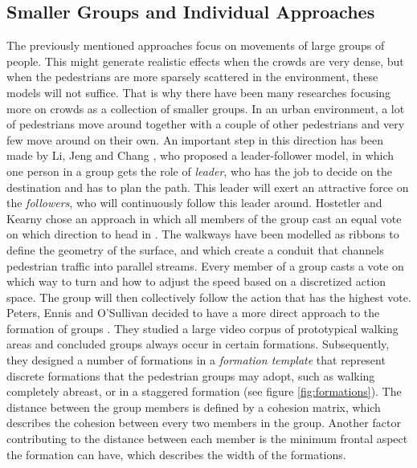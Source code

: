 \documentclass[11pt, a4paper]{book}
\begin{document}
\subsection{Smaller Groups and Individual Approaches}
The previously mentioned approaches focus on movements of large groups of people. This might generate realistic effects when the crowds are very dense, but when the pedestrians are more sparsely scattered in the environment, these models will not suffice. That is why there have been many researches focusing more on crowds as a collection of smaller groups. In an urban environment, a lot of pedestrians move around together with a couple of other pedestrians and very few move around on their own. An important step in this direction has been made by Li, Jeng and Chang \cite{leaderfollower}, who proposed a leader-follower model, in which one person in a group gets the role of \emph{leader}, who has the job to decide on the destination and has to plan the path. This leader will exert an attractive force on the \emph{followers}, who will continuously follow this leader around. Hostetler and Kearny chose an approach in which all members of the group cast an equal vote on which direction to head in \cite{Hostetler02strollingdown}. The walkways have been modelled as ribbons to define the geometry of the surface, and which create a conduit that channels pedestrian traffic into parallel streams. Every member of a group casts a vote on which way to turn and how to adjust the speed based on a discretized action space. The group will then collectively follow the action that has the highest vote. Peters, Ennis and O'Sullivan decided to have a more direct approach to the formation of groups \cite{10.1109MCG.2009.69}. They studied a large video corpus of prototypical walking areas and concluded groups always occur in certain formations. Subsequently, they designed a number of formations in a \emph{formation template} that represent discrete formations that the pedestrian groups may adopt, such as walking completely abreast, or in a staggered formation (see figure \ref{fig:formations}). The distance between the group members is defined by a cohesion matrix, which describes the cohesion between every two members in the group. Another factor contributing to the distance between each member is the minimum frontal aspect the formation can have, which describes the width of the formations.
\end{document}
